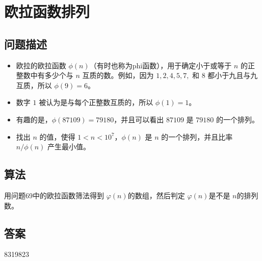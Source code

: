 \section{欧拉函数排列}
\subsection{问题描述}
\begin{tcolorbox}
\begin{itemize}
    \item 欧拉的欧拉函数 \(\phi(n)\)（有时也称为phi函数），用于确定小于或等于 \(n\) 的正整数中有多少个与 \(n\) 互质的数。例如，因为 \(1, 2, 4, 5, 7,\) 和 \(8\) 都小于九且与九互质，所以 \(\phi(9) = 6\)。
    \item 数字 \(1\) 被认为是与每个正整数互质的，所以 \(\phi(1) = 1\)。
    \item 有趣的是，\(\phi(87109) = 79180\)，并且可以看出 \(87109\) 是 \(79180\) 的一个排列。
    \item 找出 \(n\) 的值，使得 \(1 < n < 10^7\)，\(\phi(n)\) 是 \(n\) 的一个排列，并且比率 \(n / \phi(n)\) 产生最小值。
\end{itemize}
\end{tcolorbox}

\subsection{算法}
用问题69中的欧拉函数筛法得到 \( \varphi(n) \)的数组，然后判定 \( \varphi(n) \)是不是 \( n \)的排列数。

\subsection{答案}
8319823
